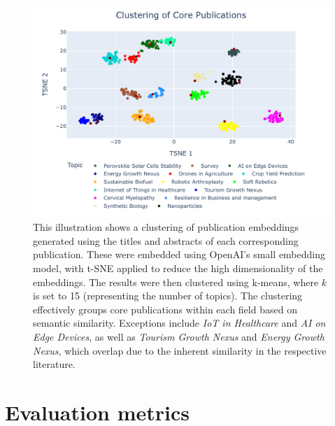\begin{figure}[!hb]
	\centering	
	\includegraphics[scale=0.4]{pics/tnse_clustering.pdf}
		\caption[Core Publications Clustering]{This illustration shows a clustering of publication embeddings generated using the titles and abstracts of each corresponding publication. These were embedded using OpenAI's small embedding model, with t-SNE applied to reduce the high dimensionality of the embeddings. The results were then clustered using k-means, where $k$ is set to 15 (representing the number of topics). The clustering effectively groups core publications within each field based on semantic similarity. Exceptions include \textit{IoT in Healthcare} and \textit{AI on Edge Devices}, as well as \textit{Tourism Growth Nexus} and \textit{Energy Growth Nexus}, which overlap due to the inherent similarity in the respective literature.}
	\label{fig:dataset-clustering}
\end{figure}

 
\section{Evaluation metrics}\label{sec:eval-metrics}
\lipsum[1-3]
